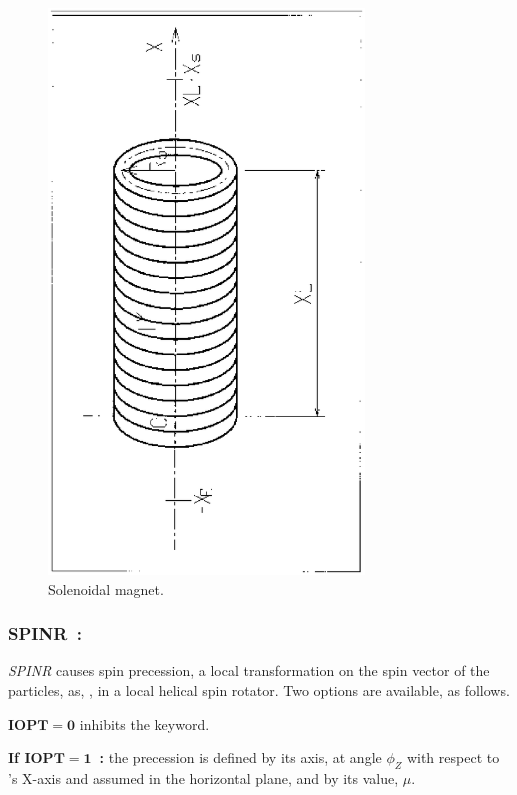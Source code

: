 \vfill

\begin{figure}[H]
\centerline{\includegraphics[height=15cm,angle=-90]{Fig30.ps}}
\caption{\label{fig30} Solenoidal magnet.}
\end{figure}
\vfill




\newpage

\subsubsection*{SPINR~: \SPINRTitl~\cite{SPINR}  } \label{SPINR}  
\medskip

\textsl{SPINR} causes spin precession, a local transformation on the spin vector of the particles, 
 as, \eg, in a local helical spin rotator.  Two options are 
available, as follows. 

\bigskip

\noindent \textbf{$\mathbf{IOPT  =  0}$} inhibits the keyword. 

\bigskip

\noindent \textbf{If $\mathbf{IOPT  =  1}$~:} the precession is defined by its axis, at angle  $\phi_Z$ with 
respect to \zgou's X-axis and assumed in the horizontal plane,  and by its value, $\mu$. 

